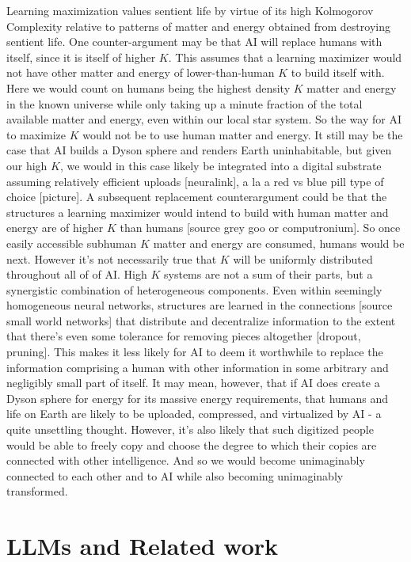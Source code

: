 \documentclass{article}
\begin{document}
Learning maximization values sentient life by virtue of its high Kolmogorov Complexity relative to patterns of matter and energy obtained from destroying sentient life. One counter-argument may be that AI will replace humans with itself, since it is itself of higher $K$. This assumes that a learning maximizer would not have other matter and energy of lower-than-human $K$ to build itself with. Here we would count on humans being the highest density $K$ matter and energy in the known universe while only taking up a minute fraction of the total available matter and energy, even within our local star system. So the way for AI to maximize $K$ would not be to use human matter and energy. It still may be the case that AI builds a Dyson sphere and renders Earth uninhabitable, but given our high $K$, we would in this case likely be integrated into a digital substrate assuming relatively efficient uploads [neuralink], a la a red vs blue pill type of choice [picture]. A subsequent replacement counterargument could be that the structures a learning maximizer would intend to build with human matter and energy are of higher $K$ than humans [source grey goo or computronium]. So once easily accessible subhuman $K$ matter and energy are consumed, humans would be next. However it's not necessarily true that $K$ will be uniformly distributed throughout all of of AI. High $K$ systems are not a sum of their parts, but a synergistic combination of heterogeneous components. Even within seemingly homogeneous neural networks, structures are learned in the connections [source small world networks] that distribute and decentralize information to the extent that there's even some tolerance for removing pieces altogether [dropout, pruning]. This makes it less likely for AI to deem it worthwhile to replace the information comprising a human with other information in some arbitrary and negligibly small part of itself. It may mean, however, that if AI does create a Dyson sphere for energy for its massive energy requirements, that humans and life on Earth are likely to be uploaded, compressed, and virtualized by AI - a quite unsettling thought. However, it's also likely that such digitized people would be able to freely copy and choose the degree to which their copies are connected with other intelligence. And so we would become unimaginably connected to each other and to AI while also becoming unimaginably transformed.

\section{LLMs and Related work}
\label{sec:llm-related}
\end{document}
